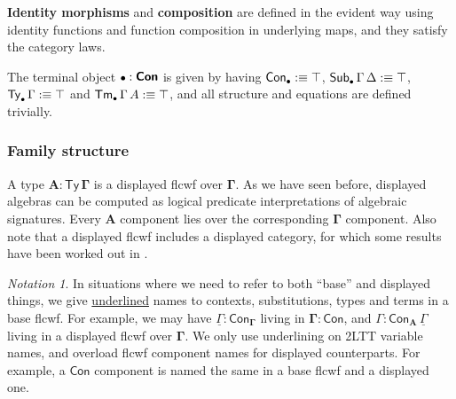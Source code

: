 \documentclass[12pt,a4paper,twoside,openany]{book}
\theoremstyle{remark}
\newtheorem{notation}{Notation}
\theoremstyle{definition}
\theoremstyle{theorem}
\newcommand{\bs}[1]{\boldsymbol{#1}}
\newcommand{\Con}{\mathsf{Con}}
\newcommand{\Sub}{\mathsf{Sub}}
\newcommand{\Tm}{\mathsf{Tm}}
\newcommand{\Ty}{\mathsf{Ty}}
\newcommand{\bCon}{\bs{\Con}}
\newcommand{\bTy}{\bs{\Ty}}
\newcommand{\bGamma}{\bs{\Gamma}}
\newcommand{\bA}{\bs{A}}
\newcommand{\bemptycon}{\scaleobj{.75}{\bs{\bullet}}}
\newcommand{\ul}[1]{\underline{#1}}
\newcommand{\ulGamma}{\ul{\Gamma}}
\newcommand{\defn}{:\equiv}
\begin{document}
\textbf{Identity morphisms} and \textbf{composition} are defined in the evident
way using identity functions and function composition in underlying maps, and
they satisfy the category laws.

The terminal object $\bemptycon:\bCon$ is given by having $\Con_{\bemptycon} \defn
\top$, $\Sub_{\bemptycon}\,\Gamma\,\Delta \defn \top$, $\Ty_{\bemptycon}\,\Gamma \defn \top$ and
$\Tm_{\bemptycon}\,\Gamma\,A \defn \top$, and all structure and equations are defined trivially.

\subsubsection{Family structure}
\label{sec:fqiit-family}

A type $\bA : \bTy\,\bGamma$ is a displayed flcwf over $\bGamma$.  As we have
seen before, displayed algebras can be computed as logical predicate
interpretations of algebraic signatures. Every $\bA$ component lies over the
corresponding $\bGamma$ component. Also note that a displayed flcwf includes a
displayed category, for which some results have been worked out in
\cite{displayedcats}.

\begin{notation} In situations where we need to refer to both ``base'' and
displayed things, we give \ul{underlined} names to contexts, substitutions,
types and terms in a base flcwf. For example, we may have $\ulGamma :
\Con_{\bGamma}$ living in $\bs{\Gamma : \Con}$, and $\Gamma :
\Con_{\bA}\,\ulGamma$ living in a displayed flcwf over $\bGamma$. We only use
underlining on 2LTT variable names, and overload flcwf component names for
displayed counterparts. For example, a $\Con$ component is named the same in
a base flcwf and a displayed one.
\end{notation}
\end{document}
